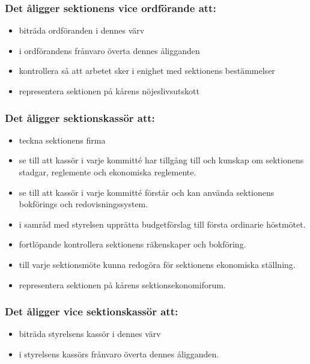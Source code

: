 \subsubsection{Det åligger sektionens vice ordförande att:}

\begin{itemize}
  \item biträda ordföranden i dennes värv 
  \item i ordförandens frånvaro överta dennes åligganden 
  \item kontrollera så att arbetet sker i enighet med sektionens bestämmelser 
  \item representera sektionen på kårens nöjeslivsutskott
\end{itemize}

\subsubsection{Det åligger sektionskassör att:}

\begin{itemize}
  \item teckna sektionens firma
  \item se till att kassör i varje kommitté har tillgång till och kunskap om sektionens stadgar, reglemente och ekonomiska reglemente.
  \item se till att kassör i varje kommitté förstår och kan använda sektionens bokförings och redovisningssystem.
  \item i samråd med styrelsen upprätta budgetförslag till första ordinarie höstmötet.
  \item fortlöpande kontrollera sektionens räkenskaper och bokföring.
  \item till varje sektionsmöte kunna redogöra för sektionens ekonomiska ställning.
  \item representera sektionen på kårens sektionsekonomiforum.
\end{itemize}

\subsubsection{Det åligger vice sektionskassör att:}

\begin{itemize}
  \item biträda styrelsens kassör i dennes värv
  \item i styrelsens kassörs frånvaro överta dennes åligganden. 
\end{itemize}


